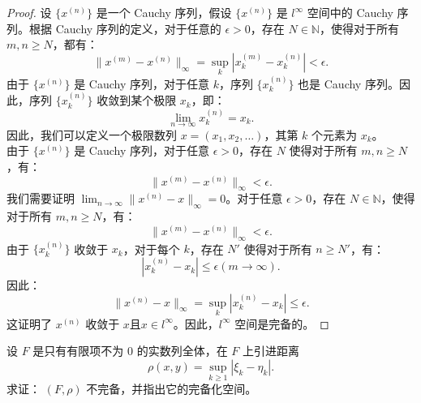 \documentclass[lang=cn,newtx,10pt,scheme=chinese,thmcnt=chapter]{elegantbook}
\begin{document}
\begin{proof}
设 \( \{ x^{(n)} \} \) 是一个 Cauchy 序列，假设 \( \{ x^{(n)} \} \) 是 \( l^\infty \) 空间中的 Cauchy 序列。根据 Cauchy 序列的定义，对于任意的 \( \epsilon > 0 \)，存在 \( N \in \mathbb{N} \)，使得对于所有 \( m, n \geq N \)，都有：
\[
\| x^{(m)} - x^{(n)} \|_\infty = \sup_k |x^{(m)}_k - x^{(n)}_k| < \epsilon.
\]
由于 \( \{ x^{(n)} \} \) 是 Cauchy 序列，对于任意 \( k \)，序列 \( \{ x^{(n)}_k \} \) 也是 Cauchy 序列。因此，序列 \( \{ x^{(n)}_k \} \) 收敛到某个极限 \( x_k \)，即：
\[
\lim_{n \to \infty} x^{(n)}_k = x_k.
\]
因此，我们可以定义一个极限数列 \( x = (x_1, x_2, \dots) \)，其第 \( k \) 个元素为 \( x_k \)。\\
由于 \( \{ x^{(n)} \} \) 是 Cauchy 序列，对于任意 \( \epsilon > 0 \)，存在 \( N \) 使得对于所有 \( m, n \geq N \)，有：
\[
\| x^{(m)} - x^{(n)} \|_\infty < \epsilon.
\]
我们需要证明 \( \lim_{n \to \infty}\limits \| x^{(n)} - x \|_\infty = 0 \)。对于任意 \( \epsilon > 0 \)，存在 \( N \in \mathbb{N} \)，使得对于所有 \( m, n \geq N \)，有：
\[
\| x^{(m)} - x^{(n)} \|_\infty < \epsilon.
\]
由于 \( \{ x^{(n)}_k \} \) 收敛于 \( x_k \)，对于每个 \( k \)，存在 \( N' \) 使得对于所有 \( n \geq N' \)，有：
\[
| x^{(n)}_k - x_k | \leqslant \epsilon(m\to\infty).
\]
因此：
\[
\| x^{(n)} - x \|_\infty = \sup_k | x^{(n)}_k - x_k | \leqslant \epsilon.
\]
这证明了 \( x^{(n)} \) 收敛于 \( x \)且$x\in l^\infty$。因此，\( l^\infty \) 空间是完备的。
\end{proof}
\begin{example}
 设 \( F \) 是只有有限项不为 0 的实数列全体，在 \( F \) 上引进距离
\[
\rho(x, y) = \sup_{k \geqslant 1} \left|\xi_k - \eta_k\right|.
\]
求证： \( (F, \rho) \) 不完备，并指出它的完备化空间。

\end{example}
\end{document}
